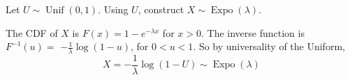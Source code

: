 

\setcounter{theorem}{14}
\begin{exercise}[BH.5.15] Let $U \sim \operatorname{Unif}(0,1)$. Using $U$, construct $X \sim \operatorname{Expo}(\lambda)$. 
\begin{solution}
    The CDF of $X$ is $F(x)=1-e^{-\lambda x}$ for $x>0$. The inverse function is $F^{-1}(u)=$ $-\frac{1}{\lambda} \log (1-u)$, for $0<u<1$. So by universality of the Uniform,
		$$
		X=-\frac{1}{\lambda} \log (1-U) \sim \operatorname{Expo}(\lambda)
		$$
\end{solution}
\end{exercise}


